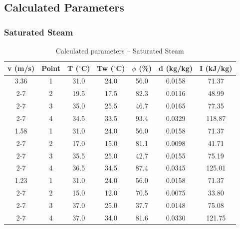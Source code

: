 \subsection{Calculated Parameters}
\subsubsection{Saturated Steam}
\begin{table}[H]
\centering
\begin{tabular}{|c|c|c|c|c|c|c|}\hline
\textbf{v (m/s)} & \textbf{Point} & \textbf{T ($^\circ$C)} & \textbf{Tw ($^\circ$C)} & \textbf{$\phi$ (\%)} & \textbf{d (kg/kg)} & \textbf{I (kJ/kg)} \\\hline
3.36 & 1 & 31.0 & 24.0 & 56.0 & 0.0158 & 71.37 \\\cline{2-7}
 & 2 & 19.5 & 17.5 & 82.3 & 0.0116 & 48.99 \\\cline{2-7}
 & 3 & 35.0 & 25.5 & 46.7 & 0.0165 & 77.35 \\\cline{2-7}
 & 4 & 34.5 & 33.5 & 93.4 & 0.0329 & 118.87 \\\hline
1.58 & 1 & 31.0 & 24.0 & 56.0 & 0.0158 & 71.37 \\\cline{2-7}
 & 2 & 17.0 & 15.0 & 81.1 & 0.0098 & 41.71 \\\cline{2-7}
 & 3 & 35.5 & 25.0 & 42.7 & 0.0155 & 75.19 \\\cline{2-7}
 & 4 & 36.5 & 34.5 & 87.4 & 0.0345 & 125.01 \\\hline
1.23 & 1 & 31.0 & 24.0 & 56.0 & 0.0158 & 71.37 \\\cline{2-7}
 & 2 & 15.0 & 12.0 & 70.5 & 0.0075 & 33.80 \\\cline{2-7}
 & 3 & 37.0 & 25.0 & 37.7 & 0.0148 & 75.08 \\\cline{2-7}
 & 4 & 37.0 & 34.0 & 81.6 & 0.0330 & 121.75 \\\hline
\end{tabular}
\caption{Calculated parameters -- Saturated Steam}
\end{table}

